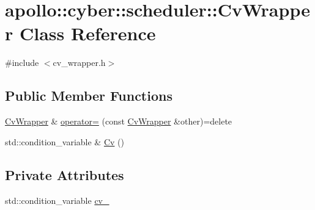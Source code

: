 \hypertarget{classapollo_1_1cyber_1_1scheduler_1_1CvWrapper}{\section{apollo\-:\-:cyber\-:\-:scheduler\-:\-:Cv\-Wrapper Class Reference}
\label{classapollo_1_1cyber_1_1scheduler_1_1CvWrapper}
}


{\ttfamily \#include $<$cv\-\_\-wrapper.\-h$>$}

\subsection*{Public Member Functions}
\begin{DoxyCompactItemize}
\item 
\hyperlink{classapollo_1_1cyber_1_1scheduler_1_1CvWrapper}{Cv\-Wrapper} \& \hyperlink{classapollo_1_1cyber_1_1scheduler_1_1CvWrapper_acfef4b07c601ecf7e848954604118075}{operator=} (const \hyperlink{classapollo_1_1cyber_1_1scheduler_1_1CvWrapper}{Cv\-Wrapper} \&other)=delete
\item 
std\-::condition\-\_\-variable \& \hyperlink{classapollo_1_1cyber_1_1scheduler_1_1CvWrapper_a3e9e358d8809e72cfbdd9cb482db1f54}{Cv} ()
\end{DoxyCompactItemize}
\subsection*{Private Attributes}
\begin{DoxyCompactItemize}
\item 
std\-::condition\-\_\-variable \hyperlink{classapollo_1_1cyber_1_1scheduler_1_1CvWrapper_a5eb86d1df76a13a371d55a2090ab755f}{cv\-\_\-}
\end{DoxyCompactItemize}


